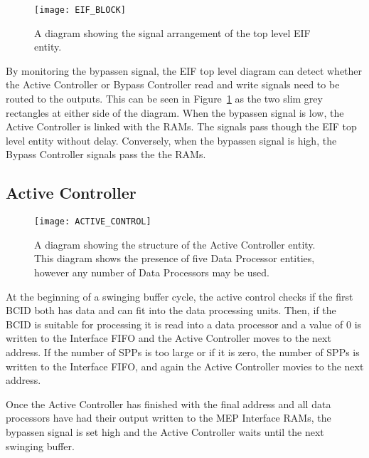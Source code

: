 		\begin{figure}[ht]
			\centering
			\texttt{[image: EIF\_BLOCK]}
			\caption{A diagram showing the signal arrangement of the top level EIF entity.}
			\label{fig:EIF_BLOCK}
		\end{figure}

		By monitoring the bypass\textunderscore en signal, the EIF top level diagram can detect whether the Active Controller or Bypass Controller read and write signals need to be routed to the outputs.
		This can be seen in Figure~\ref{fig:EIF_BLOCK} as the two slim grey rectangles at either side of the diagram.
		When the bypass\textunderscore en signal is low, the Active Controller is linked with the RAMs.
		The signals pass though the EIF top level entity without delay.
		Conversely, when the bypass\textunderscore en signal is high, the Bypass Controller signals pass the the RAMs.

		\subsection{Active Controller} %
		\label{sub:active_controller}

		\begin{figure}[ht]
			\centering
			\texttt{[image: ACTIVE\_CONTROL]}
			\caption{A diagram showing the structure of the Active Controller entity. This diagram shows the presence of five Data Processor entities, however any number of Data Processors may be used.}
			\label{fig:active_control_diagram}
		\end{figure}
		
		At the beginning of a swinging buffer cycle, the active control checks if the first BCID both has data and can fit into the data processing units.
		Then, if the BCID is suitable for processing it is read into a data processor and a value of 0 is written to the Interface FIFO and the Active Controller moves to the next address.
		If the number of SPPs is too large or if it is zero, the number of SPPs is written to the Interface FIFO, and again the Active Controller movies to the next address.

		Once the Active Controller has finished with the final address and all data processors have had their output written to the MEP Interface RAMs, the bypass\textunderscore en signal is set high and the Active Controller waits until the next swinging buffer.
		

